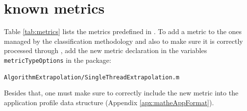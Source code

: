 \documentclass[a4paper, 10pt]{article}
\begin{document}
\section{\ex known metrics}
\label{apx:metricList}
Table \ref{tab:metrics} lists the metrics predefined in \ex.
To add a metric to the ones managed by the classification methodology and also to make sure it is correctly processed through \ex,
add the new metric declaration in the variables \texttt{metricTypeOptions} in the package:

\verb!AlgorithmExtrapolation/SingleThreadExtrapolation.m!

Besides that, one must make sure to correctly include the new metric into the application profile data structure (Appendix \ref{apx:matheAppFormat}).



% 
\end{document}
